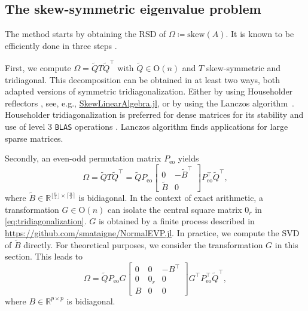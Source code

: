 \documentclass[10pt,twoside,dvipsnames]{siamart1116}
\numberwithin{algorithm}{section}
\numberwithin{equation}{section}
\begin{document}
\subsection{The skew-symmetric eigenvalue problem} The method starts by obtaining the RSD of $\Omega \coloneq \mathrm{skew}(A)$. It is known to be efficiently done in three steps \cite{WardGray78}. 

First, we compute $\Omega=\widetilde{Q}T\widetilde{Q}^\top $ with $\widetilde{Q}\in\mathrm{O}(n)$ and $T$ skew-symmetric and tridiagonal. This decomposition can be obtained in at least two ways, both adapted versions of symmetric tridiagonalization. Either by using Householder reflectors \cite{Wilkinson62}, see, e.g., \href{https://github.com/JuliaLinearAlgebra/SkewLinearAlgebra.jl/blob/main/src/hessenberg.jl}{SkewLinearAlgebra.jl}, or by using the Lanczos algorithm~\cite{HuangJia24}. Householder tridiagonalization is preferred for dense matrices for its stability and use of level 3 \texttt{BLAS} operations \cite{Bischof87,Schreiber89,Kazushige08}. Lanczos algorithm finds applications for large sparse matrices. 

Secondly, an even-odd permutation matrix $P_{\mathrm{eo}}$ yields 
\begin{equation*}%
	\Omega =\widetilde{Q}T\widetilde{Q}^\top = \widetilde{Q}P_{\mathrm{eo}}\begin{bmatrix}
	0&-\widetilde{B}^\top \\
	\widetilde{B}&0
	\end{bmatrix}P_{\mathrm{eo}}^\top \widetilde{Q}^\top,
\end{equation*}
where $\widetilde{B}\in\mathbb{R}^{\lfloor\frac{n}{2}\rfloor\times\lceil\frac{n}{2}\rceil}$ is bidiagonal. In the context of exact arithmetic, a transformation $G\in\mathrm{O}(n)$ can isolate the central square matrix $0_r$ in \eqref{eq:tridiagonalization}. $G$ is obtained by a finite process described in \url{https://github.com/smataigne/NormalEVP.jl}. In practice, we compute the SVD of $\widetilde{B}$ directly. For theoretical purposes, we consider the transformation $G$ in this section. This leads to
\begin{equation}\label{eq:tridiagonalization}
	\Omega = \widetilde{Q}P_{\mathrm{eo}}G\begin{bmatrix}
	0&0&-B^\top \\
	0&0_r&0\\
	B&0&0
	\end{bmatrix}G^\top P_{\mathrm{eo}}^\top \widetilde{Q}^\top ,
\end{equation}
where $B\in\mathbb{R}^{p\times p}$ is bidiagonal.   
\end{document}
